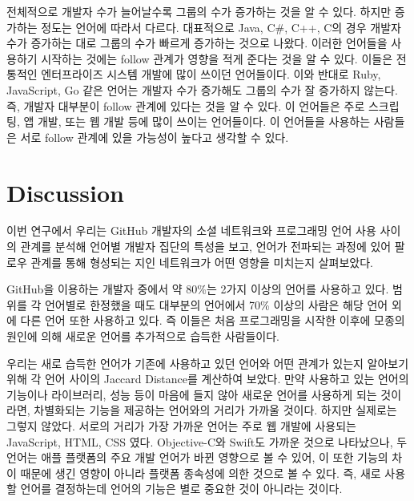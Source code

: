 \documentclass[10pt, a4paper, titlepage]{article}
\begin{document}
전체적으로 개발자 수가 늘어날수록 그룹의 수가 증가하는 것을 알 수 있다. 하지만 증가하는 정도는 언어에 따라서 다르다. 대표적으로 Java, C\#, C++, C의 경우 개발자 수가 증가하는 대로 그룹의 수가 빠르게 증가하는 것으로 나왔다. 이러한 언어들을 사용하기 시작하는 것에는 follow 관계가 영향을 적게 준다는 것을 알 수 있다. 이들은 전통적인 엔터프라이즈 시스템 개발에 많이 쓰이던 언어들이다. 이와 반대로 Ruby, JavaScript, Go 같은 언어는 개발자 수가 증가해도 그룹의 수가 잘 증가하지 않는다. 즉, 개발자 대부분이 follow 관계에 있다는 것을 알 수 있다. 이 언어들은 주로 스크립팅, 앱 개발, 또는 웹 개발 등에 많이 쓰이는 언어들이다. 이 언어들을 사용하는 사람들은 서로 follow 관계에 있을 가능성이 높다고 생각할 수 있다.


\section{Discussion}

이번 연구에서 우리는 GitHub 개발자의 소셜 네트워크와 프로그래밍 언어 사용 사이의 관계를 분석해 언어별 개발자 집단의 특성을 보고, 언어가 전파되는 과정에 있어 팔로우 관계를 통해 형성되는 지인 네트워크가 어떤 영향을 미치는지 살펴보았다.

GitHub을 이용하는 개발자 중에서 약 80\%는 2가지 이상의 언어를 사용하고 있다. 범위를 각 언어별로 한정했을 때도 대부분의 언어에서 70\% 이상의 사람은 해당 언어 외에 다른 언어 또한 사용하고 있다. 즉 이들은 처음 프로그래밍을 시작한 이후에 모종의 원인에 의해 새로운 언어를 추가적으로 습득한 사람들이다.

우리는 새로 습득한 언어가 기존에 사용하고 있던 언어와 어떤 관계가 있는지 알아보기 위해 각 언어 사이의 Jaccard Distance를 계산하여 보았다. 만약 사용하고 있는 언어의 기능이나 라이브러리, 성능 등이 마음에 들지 않아 새로운 언어를 사용하게 되는 것이라면, 차별화되는 기능을 제공하는 언어와의 거리가 가까울 것이다. 하지만 실제로는 그렇지 않았다. 서로의 거리가 가장 가까운 언어는 주로 웹 개발에 사용되는 JavaScript, HTML, CSS 였다. Objective-C와 Swift도 가까운 것으로 나타났으나, 두 언어는 애플 플랫폼의 주요 개발 언어가 바뀐 영향으로 볼 수 있어, 이 또한 기능의 차이 때문에 생긴 영향이 아니라 플랫폼 종속성에 의한 것으로 볼 수 있다. 즉, 새로 사용할 언어를 결정하는데 언어의 기능은 별로 중요한 것이 아니라는 것이다.
\end{document}
